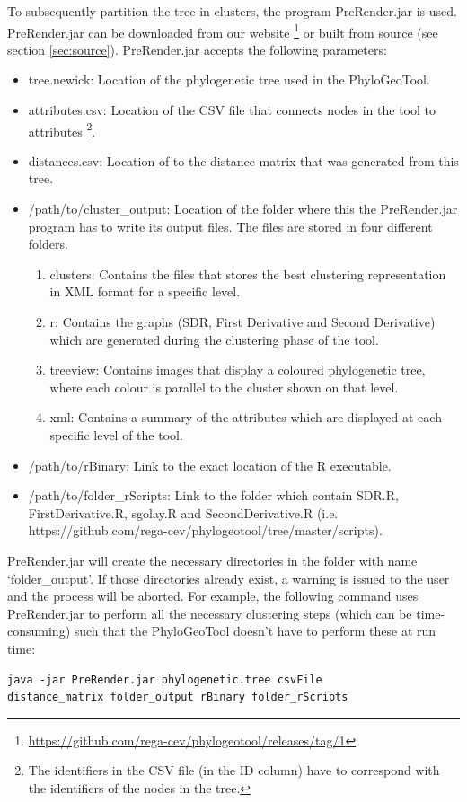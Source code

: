 \documentclass[a4paper, 11pt]{article} %
\begin{document}
To subsequently partition the tree in clusters, the program PreRender.jar is used. PreRender.jar can be downloaded from our website \footnote{\url{https://github.com/rega-cev/phylogeotool/releases/tag/1}} or built from source (see section \ref{sec:source}). 
PreRender.jar accepts the following parameters:
\begin{itemize}
\item tree.newick: Location of the phylogenetic tree used in the PhyloGeoTool.
\item attributes.csv: Location of the CSV file that connects nodes in the tool to attributes \footnote{The identifiers in the CSV file (in the ID column) have to correspond with the identifiers of the nodes in the tree.}.
\item distances.csv: Location of to the distance matrix that was generated from this tree.
\item /path/to/cluster\_output: Location of the folder where this the PreRender.jar program has to write its output files. The files are stored in four different folders.
\begin{enumerate}
	\item clusters: Contains the files that stores the best clustering representation in XML format for a specific level.
	\item r: Contains the graphs (SDR, First Derivative and Second Derivative) which are generated during the clustering phase of the tool.
	\item treeview: Contains images that display a coloured phylogenetic tree, where each colour is parallel to the cluster shown on that level.
	\item xml: Contains a summary of the attributes which are displayed at each specific level of the tool.
\end{enumerate}
\item /path/to/rBinary: Link to the exact location of the R executable.
\item /path/to/folder\_rScripts: Link to the folder which contain SDR.R, FirstDerivative.R, sgolay.R and SecondDerivative.R (i.e. https://github.com/rega-cev/phylogeotool/tree/master/scripts).
\end{itemize}
PreRender.jar will create the necessary directories in the folder with name `folder\_output'.
If those directories already exist, a warning is issued to the user and the process will be aborted.
For example, the following command uses PreRender.jar to perform all the necessary clustering steps (which can be time-consuming) such that the PhyloGeoTool doesn't have to perform these at run time: 
\begin{verbatim}
java -jar PreRender.jar phylogenetic.tree csvFile
distance_matrix folder_output rBinary folder_rScripts
\end{verbatim}
\end{document}
